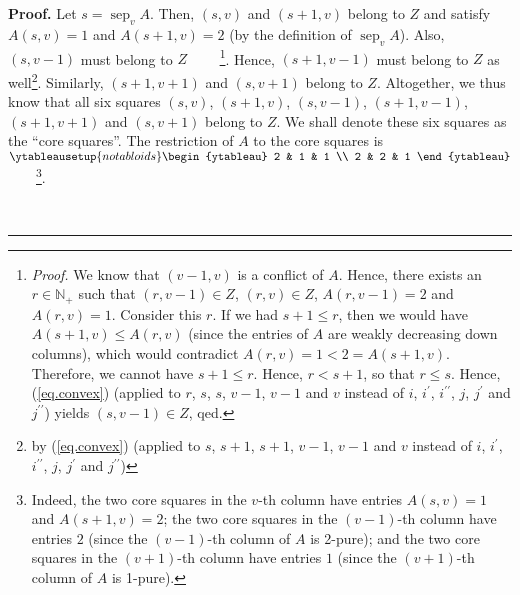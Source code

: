 \documentclass[numbers=enddot,12pt,final,onecolumn,notitlepage]{scrartcl}%
\theoremstyle{definition}
\newenvironment{proof}[1][Proof]{\noindent\textbf{#1.} }{\ \rule{0.5em}{0.5em}}
\newenvironment{vershort}{}{}
\begin{document}
\begin{vershort}
\begin{proof}
Let $s=\operatorname*{sep}\nolimits_{v}A$. Then, $\left(  s,v\right)  $ and
$\left(  s+1,v\right)  $ belong to $Z$ and satisfy $A\left(  s,v\right)  =1$
and $A\left(  s+1,v\right)  =2$ (by the definition of $\operatorname*{sep}%
\nolimits_{v}A$). Also, $\left(  s,v-1\right)  $ must belong to $Z$%
\ \ \ \ \footnote{\textit{Proof.} We know that $\left(  v-1,v\right)  $ is a
conflict of $A$. Hence, there exists an $r\in\mathbb{N}_{+}$ such that
$\left(  r,v-1\right)  \in Z$, $\left(  r,v\right)  \in Z$, $A\left(
r,v-1\right)  =2$ and $A\left(  r,v\right)  =1$. Consider this $r$. If we had
$s+1\leq r$, then we would have $A\left(  s+1,v\right)  \leq A\left(
r,v\right)  $ (since the entries of $A$ are weakly decreasing down columns),
which would contradict $A\left(  r,v\right)  =1<2=A\left(  s+1,v\right)  $.
Therefore, we cannot have $s+1\leq r$. Hence, $r<s+1$, so that $r\leq s$.
Hence, (\ref{eq.convex}) (applied to $r$, $s$, $s$, $v-1$, $v-1$ and $v$
instead of $i$, $i^{\prime}$, $i^{\prime\prime}$, $j$, $j^{\prime}$ and
$j^{\prime\prime}$) yields $\left(  s,v-1\right)  \in Z$, qed.}. Hence,
$\left(  s+1,v-1\right)  $ must belong to $Z$ as well\footnote{by
(\ref{eq.convex}) (applied to $s$, $s+1$, $s+1$, $v-1$, $v-1$ and $v$ instead
of $i$, $i^{\prime}$, $i^{\prime\prime}$, $j$, $j^{\prime}$ and $j^{\prime
\prime}$)}. Similarly, $\left(  s+1,v+1\right)  $ and $\left(  s,v+1\right)  $
belong to $Z$. Altogether, we thus know that all six squares $\left(
s,v\right)  $, $\left(  s+1,v\right)  $, $\left(  s,v-1\right)  $, $\left(
s+1,v-1\right)  $, $\left(  s+1,v+1\right)  $ and $\left(  s,v+1\right)  $
belong to $Z$. We shall denote these six squares as the \textquotedblleft core
squares\textquotedblright. The restriction of $A$ to the core squares is $%
\ytableausetup{notabloids}
\begin{ytableau}
2 & 1 & 1 \\
2 & 2 & 1
\end{ytableau}%
$\ \ \ \ \footnote{Indeed, the two core squares in the $v$-th column have
entries $A\left(  s,v\right)  =1$ and $A\left(  s+1,v\right)  =2$; the two
core squares in the $\left(  v-1\right)  $-th column have entries $2$ (since
the $\left(  v-1\right)  $-th column of $A$ is 2-pure); and the two core
squares in the $\left(  v+1\right)  $-th column have entries $1$ (since the
$\left(  v+1\right)  $-th column of $A$ is 1-pure).}.


\end{proof}
\end{vershort}
\end{document}
